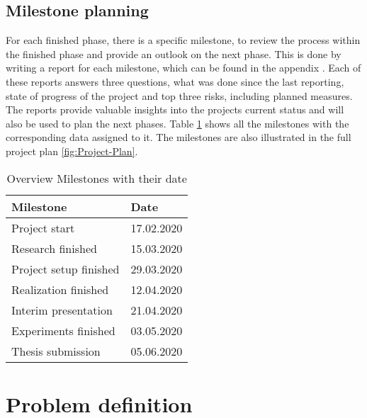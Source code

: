 \subsection{Milestone planning}
\label{sec:Milestone-Planning}

For each finished phase, there is a specific milestone, to review the process within the finished phase and provide an outlook on the next phase. This is done by writing a report for each milestone, which can be found in the appendix . Each of these reports answers three questions, what was done since the last reporting, state of progress of the project and top three risks, including planned measures. The reports provide valuable insights into the projects current status and will also be used to plan the next phases. Table \ref{tab:Milestones} shows all the milestones with the corresponding data assigned to it. The milestones are also illustrated in the full project plan \ref{fig:Project-Plan}.

\begin{table}[htbp]
    \centering
    \caption{Overview Milestones with their date}
	\label{tab:Milestones}
    \begin{tabular}{p{} | p{}}
        \toprule
        \textbf{Milestone} & \textbf{Date} \\ 
        \midrule[1pt]
        Project start & 17.02.2020\\
        \hline
        Research finished & 15.03.2020\\
        \hline
        Project setup finished & 29.03.2020\\
        \hline
        Realization finished & 12.04.2020\\
        \hline
        Interim presentation & 21.04.2020\\
        \hline
        Experiments finished & 03.05.2020\\
        \hline
        Thesis submission & 05.06.2020\\
        \bottomrule
    \end{tabular}
\end{table}

\section{Problem definition}
\label{sec:Method-Problem-Definition}


